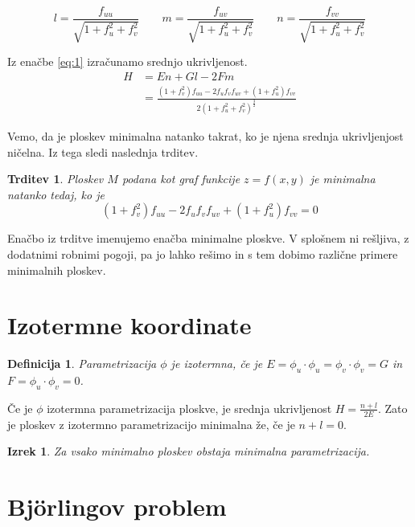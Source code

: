 \documentclass{article}
\newtheorem{definicija}{Definicija}
\newtheorem{trditev}{Trditev}
\newtheorem{izrek}{Izrek}
\begin{document}
    $$ l = \frac{f_{uu}}{\sqrt{1 + f_u^2 + f_v^2}} \qquad 
    m = \frac{f_{uv}}{\sqrt{1 + f_u^2 + f_v^2}} \qquad
    n = \frac{f_{vv}}{\sqrt{1 + f_u^2 + f_v^2}} $$

    Iz enačbe \ref{eq:1} izračunamo srednjo ukrivljenost. 
    \begin{align*}
        H &= E n + G l - 2 F m \\
        &= \frac{ (1 + f_v^2) f_{uu} - 2 f_u f_v f_{uv} + (1 + f_u^2) f_{vv} }{ 2 (1 + f_u^2 + f_v^2)^{\frac{3}{2}} }
    \end{align*} 

    Vemo, da je ploskev minimalna natanko takrat, ko je njena srednja ukrivljenjost ničelna. Iz tega sledi naslednja 
    trditev.

    \begin{trditev}
        Ploskev $M$ podana kot graf funkcije $z = f(x, y)$ je minimalna natanko tedaj, ko je
        $$ (1 + f_v^2) f_{uu} - 2 f_u f_v f_{uv} + (1 + f_u^2) f_{vv} = 0 $$
    \end{trditev}

    Enačbo iz trditve imenujemo enačba minimalne ploskve. V splošnem ni rešljiva, z dodatnimi robnimi pogoji, pa jo lahko rešimo in
    s tem dobimo različne primere minimalnih ploskev.


    \section{Izotermne koordinate}
    \begin{definicija}
        Parametrizacija $\phi$ je \emph{izotermna}, če je $E = \phi_u \cdot \phi_u = \phi_v \cdot \phi_v = G$ in $F = \phi_u \cdot \phi_v = 0$.
    \end{definicija}

    Če je $\phi$ izotermna parametrizacija ploskve, je srednja ukrivljenost $H = \frac{n + l}{2E}$. Zato je ploskev z izotermno parametrizacijo
    minimalna že, če je $n + l = 0$.

    \begin{izrek}
        Za vsako minimalno ploskev obstaja minimalna parametrizacija.
    \end{izrek}



    \section{Björlingov problem}
    
\end{document}
